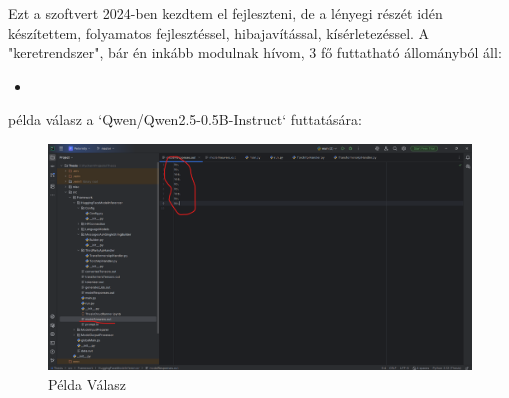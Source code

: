 \usepackage{graphicx}\begin{Document}
    Ezt a szoftvert 2024-ben kezdtem el fejleszteni, de a lényegi részét idén készítettem, folyamatos fejlesztéssel, hibajavítással, kísérletezéssel.
    A "keretrendszer", bár én inkább modulnak hívom, 3 fő futtatható állományból áll:
    \begin{itemize}
        \item
    \end{itemize}
    példa válasz a `Qwen/Qwen2.5-0.5B-Instruct` futtatására:
    \begin{figure}
        \centering
        \includegraphics[keepaspectratio]{pelda}
        \caption{Példa Válasz}
        \label{fig:PeldaValasz}
    \end{figure}
\end{Document}